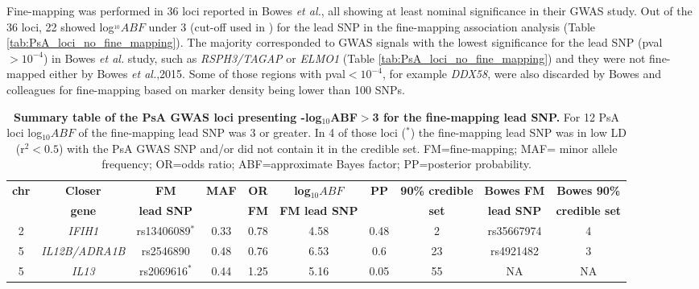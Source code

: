 Fine-mapping was performed in 36 loci reported in Bowes \textit{et al.}, all showing at least nominal significance in their GWAS study. Out of the 36 loci, 22 showed log$^{_10}ABF$ under 3 (cut-off used in \parencite{Bunt2015}) for the lead SNP in the fine-mapping association analysis (Table \ref{tab:PsA_loci_no_fine_mapping}). The majority corresponded to GWAS signals with the lowest significance for the lead SNP (pval$>10^{-4}$) in Bowes \textit{et al.} study, such as \textit{RSPH3/TAGAP} or \textit{ELMO1} (Table \ref{tab:PsA_loci_no_fine_mapping}) and they were not fine-mapped either by Bowes \textit{et al.},2015. Some of those regions with pval$<10^{-4}$, for example \textit{DDX58}, were also discarded by Bowes and colleagues for fine-mapping based on marker density being lower than 100 SNPs. 
 

\begin{landscape}
\begin{center}
\begin{longtable}[ht]{c c c c c c c c c c}
\caption[Summary table of the PsA GWAS loci presenting log${_10}ABF>3$ for the fine-mapping lead SNP.]{\textbf{Summary table of the PsA GWAS loci presenting -log${_10}$ABF$>$3 for the fine-mapping lead SNP.} For 12 PsA loci log${_10}ABF$ of the fine-mapping lead SNP was 3 or greater. In 4 of those loci ($^{\ast}$) the fine-mapping lead SNP was in low LD (r${^2}<0.5$) with the PsA GWAS SNP and/or did not contain it in the credible set. FM=fine-mapping; MAF= minor allele frequency; OR=odds ratio; ABF=approximate Bayes factor; PP=posterior probability.}
\label{tab:PsA_fine_mapping_summary} \\
\toprule
\textbf{chr} & \textbf{Closer} & \textbf{FM} & \textbf{MAF} & \textbf{OR} & \textbf{log${_10}ABF$} & \textbf{PP} & \textbf{90\% credible} &\textbf{Bowes FM} & \textbf{Bowes 90\%}\\
    & \textbf{gene} & \textbf{lead SNP} & & \textbf{FM} & \textbf{FM lead SNP} &  & \textbf{set} &\textbf{lead SNP} & \textbf{credible set} \\
\midrule
\midrule
2	 &\textit{IFIH1}	       & rs13406089$^{\ast}$	&0.33	&0.78	&4.58	&0.48	&2	&rs35667974	&4 \\
5	 &\textit{IL12B/ADRA1B}  & rs2546890	&0.48	&0.76	&6.53	&0.6	&23	&rs4921482	&3 \\
5	 &\textit{IL13}	         &rs2069616$^{\ast}$	  &0.44	&1.25	&5.16	&0.05	&55	&NA	 &NA \\

\end{longtable}
\end{center}
\end{landscape}
